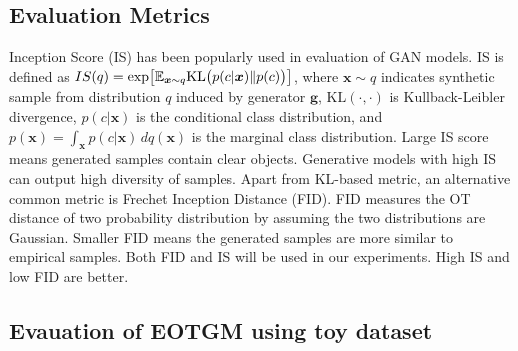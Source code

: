 \subsection{Evaluation Metrics}\label{subsec-metric}
Inception Score (IS) has been popularly used in evaluation of GAN
models\cite{NIPS2016_6125}. IS is defined as $
  IS(q) = \exp\bigl[ \mathbb{E}_{\bm{x} \sim q} \mathrm{KL}\bigl( p(c | \bm{x})\| p(c) \bigr)  \bigr]$,
where $\bm{x}\sim q$
indicates synthetic sample from distribution $q$ induced by generator $\bm{g}$, $\mathrm{KL}(\cdot, \cdot)$ is Kullback-Leibler divergence, $p(c|\bm{x})$ is the
conditional class distribution, and $p(\bm{x}) = \int_{\bm{x}}p(c|\bm{x}) \,d q(\bm{x})$
is the marginal class distribution. Large IS score means generated
samples contain clear objects. Generative models with high IS can output high
diversity of samples.
Apart from KL-based metric,
an alternative common metric is Frechet Inception Distance (FID)\cite{2017arXiv170608500H}. FID measures the OT distance
of two probability distribution by assuming the two distributions are
Gaussian. Smaller FID means the generated samples are more similar to
empirical samples. Both FID and IS will be used in our experiments. High IS and low FID are better. 

\vspace{-3pt}
\subsection{Evauation of EOTGM using toy dataset}\label{subsec-mg}

